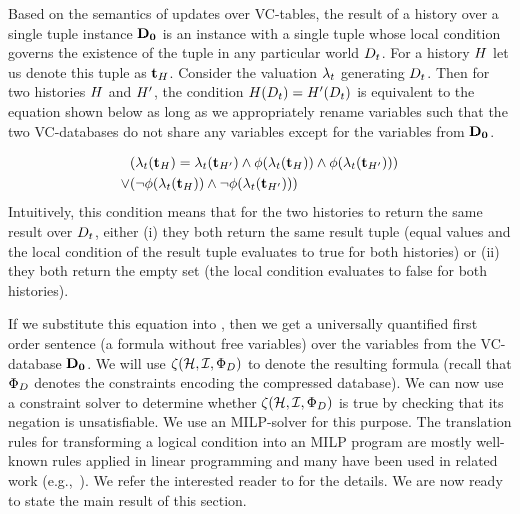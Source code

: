 Based on the semantics of updates over VC-tables, the result of a history over a single tuple instance $\mathbf{D_0}$ is an instance with a single tuple whose local condition governs the existence of the tuple in any particular world $D_{t}$. For a history $H$ let us denote this tuple as $\mathbf{t}_{H}$. Consider the valuation $\lambda_{t}$ generating $D_{t}$. Then for two histories $H$ and $H'$, the condition $H(D_{t}) = H'(D_{t})$ is equivalent to the equation shown below as long as we appropriately rename variables such that the two VC-databases do not share any variables except for the variables from $\mathbf{D_0}$. %

\begin{align}
  \label{eq:db-equals-symbolic}
  \begin{split}
      &(\lambda_{t}(\mathbf{t}_{H}) = \lambda_{t}(\mathbf{t}_{H'}) \land  \phi(\lambda_{t}(\mathbf{t}_{H})) \land \phi(\lambda_{t}(\mathbf{t}_{H'})))\\
  \vee &(\neg \phi(\lambda_{t}(\mathbf{t}_{H})) \land \neg \phi(\lambda_{t}(\mathbf{t}_{H'})))
  \end{split}
\end{align}
%
Intuitively, this condition means that for the two histories to return the same result over $D_{t}$, either (i) they both return the same result tuple (equal values and the local condition of the result tuple evaluates to true for both histories) or (ii) they both return the empty set (the local condition evaluates to false for both histories).

If we substitute this equation into , then we get a universally quantified first order sentence (a formula without free variables) over the variables from the VC-database $\mathbf{D_0}$. We will use $\zeta({\mathcal{H}},{\mathcal{I}},{\Phi_{D}})$ to denote the resulting formula (recall that $\Phi_{D}$ denotes the constraints encoding the compressed database). We can now use a constraint solver to determine whether $\zeta({\mathcal{H}},{\mathcal{I}},{\Phi_{D}})$ is true by checking that its negation is unsatisfiable. We use an MILP-solver for this purpose. The translation rules for transforming a logical condition into an MILP program are mostly well-known rules applied in linear programming and many have been used in related work (e.g.,~\cite{MeliouS12}). We refer the interested reader to \cite{techreport} for the details.
  We are now ready to state the main result of this section.

